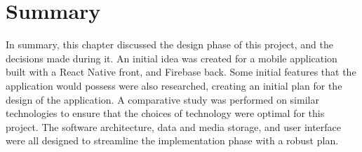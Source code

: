 \section{Summary}

In summary, this chapter discussed the design phase of this project, and the decisions made during it. An initial idea was created for a mobile application built with a React Native front, and Firebase back. Some initial features that the application would possess were also researched, creating an initial plan for the design of the application. A comparative study was performed on similar technologies to ensure that the choices of technology were optimal for this project. The software architecture, data and media storage, and user interface were all designed to streamline the implementation phase with a robust plan.